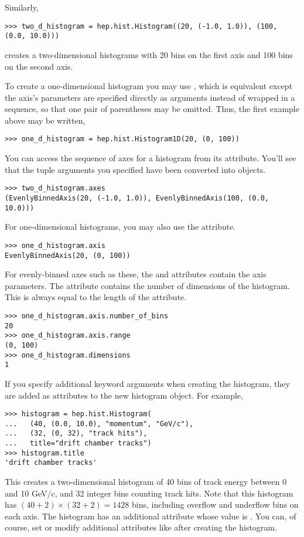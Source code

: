 Similarly,
\begin{verbatim}
>>> two_d_histogram = hep.hist.Histogram((20, (-1.0, 1.0)), (100, (0.0, 10.0)))
\end{verbatim}
creates a two-dimensional histograms with 20 bins on the first axis and
100 bins on the second axis.

To create a one-dimensional histogram you may use
, which is equivalent except the axis's
parameters are specified directly as arguments instead of wrapped in a
sequence, so that one pair of parentheses may be omitted.  Thus, the
first example above may be written,
\begin{verbatim}
>>> one_d_histogram = hep.hist.Histogram1D(20, (0, 100))
\end{verbatim}

You can access the sequence of axes for a histogram from its 
attribute.  You'll see that the tuple arguments you specified have been
converted into  objects.
\begin{verbatim}
>>> two_d_histogram.axes
(EvenlyBinnedAxis(20, (-1.0, 1.0)), EvenlyBinnedAxis(100, (0.0, 10.0)))
\end{verbatim}
For one-dimensional histograms, you may also use the  attribute.
\begin{verbatim}
>>> one_d_histogram.axis
EvenlyBinnedAxis(20, (0, 100))
\end{verbatim}

For evenly-binned axes such as these, the  and
 attributes contain the axis parameters.  The
 attribute contains the number of dimensions of the 
histogram.  This is always equal to the length of the 
attribute.
\begin{verbatim}
>>> one_d_histogram.axis.number_of_bins
20
>>> one_d_histogram.axis.range
(0, 100)
>>> one_d_histogram.dimensions
1
\end{verbatim}

If you specify additional keyword arguments when creating the histogram,
they are added as attributes to the new histogram object.  For example,
\begin{verbatim}
>>> histogram = hep.hist.Histogram(
...   (40, (0.0, 10.0), "momentum", "GeV/c"),
...   (32, (0, 32), "track hits"),
...   title="drift chamber tracks")
>>> histogram.title
'drift chamber tracks'
\end{verbatim}
This creates a two-dimensional histogram of 40 bins of track energy
between 0 and 10 GeV/c, and 32 integer bins counting track hits.  Note
that this histogram has $(40 + 2) \times (32 + 2) = 1428$ bins,
including overflow and underflow bins on each axis.  The histogram has
an additional attribute  whose value is
.  You can, of course, set or modify
additional attributes like  after creating the histogram.

